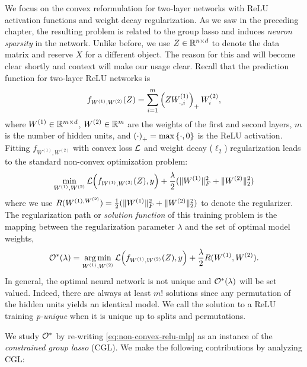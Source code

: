 We focus on the convex reformulation for two-layer networks with ReLU activation
functions and weight decay regularization.
As we saw in the preceding chapter, the resulting problem is related to the
group lasso \citep{yuan2006model} and induces \emph{neuron sparsity} in the
network.
Unlike before, we use \( Z \in \mathbb{R}^{n \times d} \) to denote the data matrix and
reserve \( X \) for a different object.
The reason for this and will become clear shortly and context will make
our usage clear.
Recall that the prediction function for two-layer ReLU networks is
\begin{equation*}
    f_{W^{(1)}, W^{(2)}}(Z) = \sum_{i=1}^m \left(Z W^{(1)}_{\cdot, i}\right)_+ W^{(2)}_{i},
\end{equation*}
where \( W^{(1)} \in \mathbb{R}^{m \times d} \), \( W^{(2)} \in \mathbb{R}^m \) are the weights of
the first and second layers, \( m \) is the number of hidden units,
and \( \left(\cdot\right)_+ = \max\left\{\cdot, 0\right\} \) is the ReLU activation.
Fitting \( f_{W^{(1)}, W^{(2)}} \) with convex loss \( \mathcal{L} \)
and weight decay (\( \ell_2 \)) regularization leads to the
standard non-convex optimization problem:
\begin{equation}\label{eq:non-convex-relu-mlp}
    \min_{W^{(1)}, W^{(2)}}  \mathcal{L}\Big(f_{W^{(1)}, W^{(2)}}(Z), y \Big)
    + \frac{\lambda}{2} (\|W^{(1)}\|_F^2 + \|W^{(2)}\|_2^2)
\end{equation}
where we use
\( R(W^{(1), W^{(2)}}) = \frac 1 2 (\|W^{(1)}\|_F^2 + \|W^{(2)}\|_2^2) \)
to denote the regularizer.
The regularization path or \emph{solution function} of this training problem
is the mapping between the regularization parameter \( \lambda \) and the set of
optimal model weights,
\begin{equation}\label{eq:solution-function}
    \mathcal{O}^*(\lambda) = \mathop{\rm arg\,min}_{W^{(1)}, W^{(2)}}  \mathcal{L}\Big(f_{W^{(1)}, W^{(2)}}(Z), y \Big)
    + \frac{\lambda}{2} R(W^{(1)}, W^{(2)}).
\end{equation}
In general, the optimal neural network is not unique and \( \mathcal{O}^*(\lambda) \)
will be set valued.
Indeed, there are always at least \( m! \) solutions since any permutation of
the hidden units yields an identical model.
We call the solution to a ReLU training \emph{p-unique} when it is unique
up to splits and permutations.

We study \( \mathcal{O}^* \) by re-writing
\cref{eq:non-convex-relu-mlp} as an instance of the
\emph{constrained group lasso} (CGL).
We make the following contributions by analyzing CGL:\

